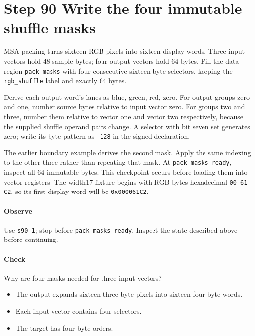 \section{Step 90 Write the four immutable shuffle masks}
MSA packing turns sixteen RGB pixels into sixteen display words. Three input vectors hold 48 sample bytes; four output vectors hold 64 bytes. Fill the data region \texttt{pack\_masks} with four consecutive sixteen-byte selectors, keeping the \texttt{rgb\_shuffle} label and exactly 64 bytes.

Derive each output word’s lanes as blue, green, red, zero. For output groups zero and one, number source bytes relative to input vector zero. For groups two and three, number them relative to vector one and vector two respectively, because the supplied shuffle operand pairs change. A selector with bit seven set generates zero; write its byte pattern as \texttt{-128} in the signed declaration.

The earlier boundary example derives the second mask. Apply the same indexing to the other three rather than repeating that mask. At \texttt{pack\_masks\_ready}, inspect all 64 immutable bytes. This checkpoint occurs before loading them into vector registers. The width17 fixture begins with RGB bytes hexadecimal \texttt{00 61 C2}, so its first display word will be \texttt{0x000061C2}.

\paragraph{Observe} Use \texttt{s90-1}; stop before \texttt{pack\_masks\_ready}. Inspect the state described above before continuing.

\paragraph{Check} Why are four masks needed for three input vectors?
\begin{itemize}
  \item[A.] The output expands sixteen three-byte pixels into sixteen four-byte words.
  \item[B.] Each input vector contains four selectors.
  \item[C.] The target has four byte orders.
\end{itemize}
